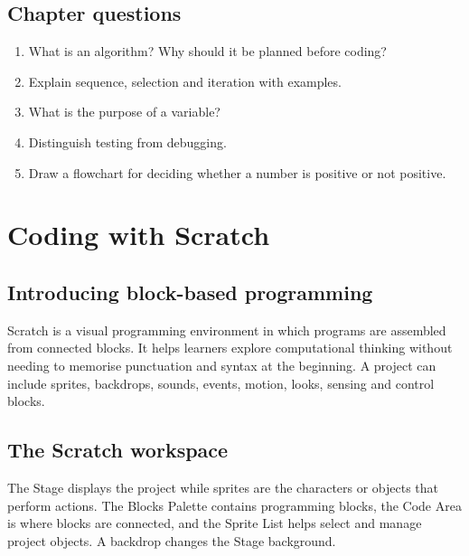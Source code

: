 \documentclass[11pt,openany,oneside]{book}
\begin{document}
\section{Chapter questions}
\begin{enumerate}
\item What is an algorithm? Why should it be planned before coding?
\item Explain sequence, selection and iteration with examples.
\item What is the purpose of a variable?
\item Distinguish testing from debugging.
\item Draw a flowchart for deciding whether a number is positive or not positive.
\end{enumerate}

\chapter{Coding with Scratch}
\section{Introducing block-based programming}
Scratch is a visual programming environment in which programs are assembled from connected blocks. It helps learners explore computational thinking without needing to memorise punctuation and syntax at the beginning. A project can include sprites, backdrops, sounds, events, motion, looks, sensing and control blocks.

\section{The Scratch workspace}
The Stage displays the project while sprites are the characters or objects that perform actions. The Blocks Palette contains programming blocks, the Code Area is where blocks are connected, and the Sprite List helps select and manage project objects. A backdrop changes the Stage background.

\begin{center}
\end{center}
\end{document}
